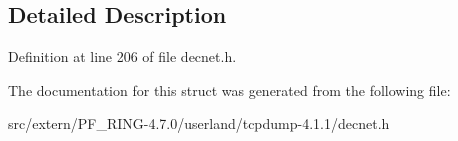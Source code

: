 \subsection{Detailed Description}


Definition at line 206 of file decnet.h.



The documentation for this struct was generated from the following file:\begin{DoxyCompactItemize}
\item 
src/extern/PF\_\-RING-\/4.7.0/userland/tcpdump-\/4.1.1/decnet.h\end{DoxyCompactItemize}
